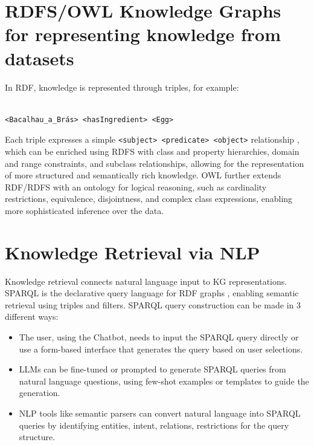 \documentclass[conference]{IEEEtran}
\begin{document}
  




\section{RDFS/OWL Knowledge Graphs for representing knowledge from datasets}
\noindent
In RDF, knowledge is represented through triples, for example:

\begin{verbatim}

<Bacalhau_a_Brás> <hasIngredient> <Egg>

\end{verbatim}
\noindent
Each triple expresses a simple \texttt{<subject> <predicate> <object>} relationship \cite{KL2025slides}, which can be enriched using RDFS with class and property hierarchies, domain and range constraints, and subclass relationships, allowing for the representation of more structured and semantically rich knowledge. OWL further extends RDF/RDFS with an ontology for logical reasoning, such as cardinality restrictions, equivalence, disjointness, and complex class expressions, enabling more sophisticated inference over the data.


\section{Knowledge Retrieval via NLP}
\noindent
Knowledge retrieval connects natural language input to KG representations. SPARQL is the declarative query language for RDF graphs \cite{KL2025slides}, enabling semantic retrieval using triples and filters.
SPARQL query construction can be made in 3 different ways:
\begin{itemize}
    \item The user, using the Chatbot, needs to input the SPARQL query directly or use a form-based interface that generates the query based on user selections.
    \item LLMs can be fine-tuned or prompted to generate SPARQL queries from natural language questions, using few-shot examples or templates to guide the generation.
    \item NLP tools like semantic parsers can convert natural language into SPARQL queries by identifying entities, intent, relations, restrictions for the query structure.
\end{itemize}
\end{document}
